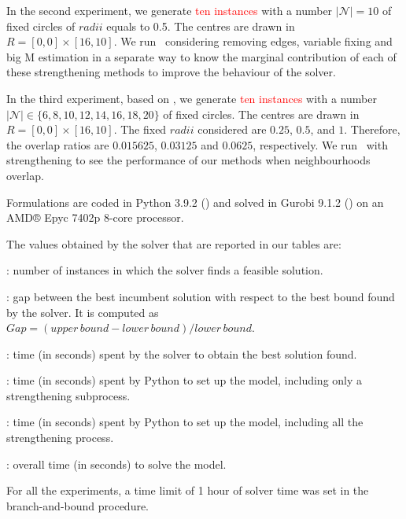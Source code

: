 \documentclass[a4paper,  review, authoryear, 1p.]{elsarticle}
\newcommand{\TSPN}{{\sf{H-TSPN}\xspace }}
\newcommand{\CV}[1]{{\color{red}#1}}
\begin{document}
\CV{In the second experiment, we generate \textcolor{red}{ten instances} with a number $|\mathcal N| = 10$ of fixed circles of $radii$ equals to 0.5. The centres are drawn in $R=[0, 0]\times[16, 10]$. We run \TSPN \ considering removing edges, variable fixing and big M estimation in a separate way to know the marginal contribution of each of these strengthening methods to improve the behaviour of the solver.} 

In the \CV{third} experiment, based on \cite{behdani2014}, we generate \textcolor{red}{ten instances} with a number $|\mathcal N|\in\{6, 8, 10, 12, 14, 16, 18, 20\}$ of fixed circles. The centres are drawn in $R=[0, 0]\times[16, 10]$. The fixed $radii$ considered are $0.25$, $0.5$, and $1$. Therefore, the overlap ratios are $0.015625$, $0.03125$ and $0.0625$, respectively. We run \TSPN \ with strengthening to see the performance of our methods when neighbourhoods overlap.

Formulations are coded in Python 3.9.2 (\citet{vanrossum2009}) and solved in Gurobi 9.1.2 (\citet{gurobioptimizationllc2022}) on an AMD® Epyc 7402p 8-core processor.

The values obtained by the solver that are reported in our tables are:

\begin{itemize}
\item {}: number of instances in which the solver finds a feasible solution.
\item {}: gap between the best incumbent solution with respect to the best bound found by the solver. It is computed as $Gap=(upper\, bound - lower\, bound)/lower\, bound$.
\item {}: time \CV{(in seconds)} spent by the solver to obtain the best solution found.
\CV{\item {}: time \CV{(in seconds)} spent by Python to set up the model, including only a strengthening subprocess.}
\item {}: time \CV{(in seconds)} spent by Python to set up the model, including all the strengthening process.
\item {}: overall time \CV{(in seconds)} to solve the model.
\end{itemize}

For all the experiments, a time limit of 1 hour of solver time was set in the branch-and-bound procedure.
\end{document}
